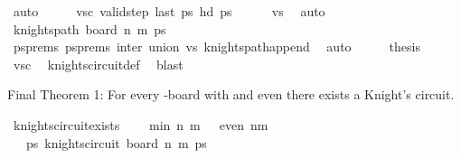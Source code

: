 \begin{isabellebody}
\ auto\isanewline
\ \ \isamarkupfalse%
\ \isamarkupfalse%
\ vs{\isacharunderscore}{\kern0pt}c{\isacharcolon}{\kern0pt}\ {\isachardoublequoteopen}valid{\isacharunderscore}{\kern0pt}step\ {\isacharparenleft}{\kern0pt}last\ {\isacharquery}{\kern0pt}ps{\isacharparenright}{\kern0pt}\ {\isacharparenleft}{\kern0pt}hd\ {\isacharquery}{\kern0pt}ps{\isacharparenright}{\kern0pt}{\isachardoublequoteclose}\isanewline
\ \ \ \ \isamarkupfalse%
\ vs\ \isamarkupfalse%
\ auto\isanewline
\isanewline
\ \ \isamarkupfalse%
\ {\isachardoublequoteopen}knights{\isacharunderscore}{\kern0pt}path\ {\isacharparenleft}{\kern0pt}board\ n\ m{\isacharparenright}{\kern0pt}\ {\isacharquery}{\kern0pt}ps{\isachardoublequoteclose}\isanewline
\ \ \ \ \isamarkupfalse%
\ psprems\ psprems\ inter\ union\ vs\ knights{\isacharunderscore}{\kern0pt}path{\isacharunderscore}{\kern0pt}append\ \isamarkupfalse%
\ auto\isanewline
\ \ \isamarkupfalse%
\ \isamarkupfalse%
\ {\isacharquery}{\kern0pt}thesis\isanewline
\ \ \ \ \isamarkupfalse%
\ vs{\isacharunderscore}{\kern0pt}c\ \isamarkupfalse%
\ knights{\isacharunderscore}{\kern0pt}circuit{\isacharunderscore}{\kern0pt}def\ \isamarkupfalse%
\ blast\isanewline
{}\isamarkupfalse%
%
\endisatagproof
{\isafoldproof}%
%
\isadelimproof
%
\endisadelimproof
%
\begin{isamarkuptext}%
Final Theorem 1: For every -board with  and  even there exists a 
Knight's circuit.%
\end{isamarkuptext}\isamarkuptrue%
\isamarkupfalse%
\ knights{\isacharunderscore}{\kern0pt}circuit{\isacharunderscore}{\kern0pt}exists{\isacharcolon}{\kern0pt}\ \isanewline
\ \ \ {\isachardoublequoteopen}min\ n\ m\ {\isasymge}\ {}{\isachardoublequoteclose}\ {\isachardoublequoteopen}even\ {\isacharparenleft}{\kern0pt}n{\isacharasterisk}{\kern0pt}m{\isacharparenright}{\kern0pt}{\isachardoublequoteclose}\isanewline
\ \ \ {\isachardoublequoteopen}{\isasymexists}ps{\isachardot}{\kern0pt}\ knights{\isacharunderscore}{\kern0pt}circuit\ {\isacharparenleft}{\kern0pt}board\ n\ m{\isacharparenright}{\kern0pt}\ ps{\isachardoublequoteclose}\isanewline

\end{isabellebody}
